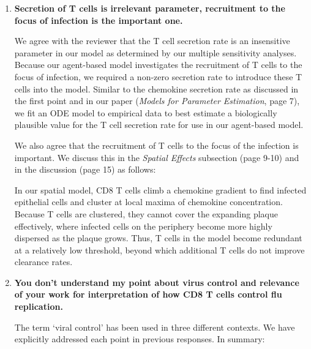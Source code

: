 \documentclass[10pt]{article}
\newenvironment{response}{\fontfamily{cmr}}{\par}
\begin{document}
\begin{enumerate}
\begin{response}
\end{response}


\item \textbf{Secretion of T cells is irrelevant parameter, recruitment to the focus of 
infection is the important one.}

\begin{response}

We agree with the reviewer that the T cell secretion rate is an insensitive parameter in our model as determined by our multiple sensitivity analyses.  Because our agent-based model investigates the recruitment of T cells to the focus of infection, we required a non-zero secretion rate to introduce these T cells into the model.  Similar to the chemokine secretion rate as discussed in the first point and in our paper (\textit{Models for Parameter Estimation}, page 7), we fit an ODE model to empirical data to best estimate a biologically plausible value for the T cell secretion rate for use in our agent-based model.

We also agree that the recruitment of T cells to the focus of the infection is important.  We discuss this in the \textit{Spatial Effects} subsection (page 9-10) and in the discussion (page 15) as follows:

\begin{displayquote}
In our spatial model, CD8 T cells climb a chemokine gradient to find infected epithelial cells and
cluster at local maxima of chemokine concentration. Because T cells are clustered, they cannot cover the
expanding plaque effectively, where infected cells on the periphery become more highly dispersed as the
plaque grows. Thus, T cells in the model become redundant at a relatively low threshold, beyond which
additional T cells do not improve clearance rates.
\end{displayquote}

\end{response}

\item \textbf{You don't understand my point about virus control and relevance of your work
for interpretation of how CD8 T cells control flu replication.}

\begin{response}

The term `viral control' has been used in three different contexts.  We have explicitly addressed each point in previous responses.  In summary:


\end{response}
\end{enumerate}
\end{document}
